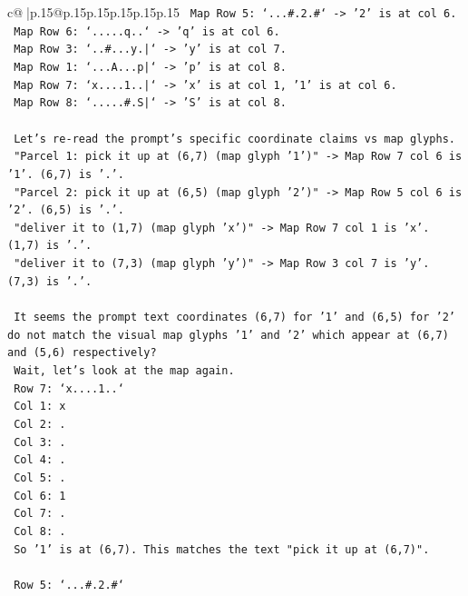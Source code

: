 \documentclass{article}
\begin{document}
{\begin{supertabular}{c@{$\;$}|p{.15\linewidth}@{}p{.15\linewidth}p{.15\linewidth}p{.15\linewidth}p{.15\linewidth}p{.15\linewidth}}
{{{\texttt{       Map Row 5: `...\#.2.\#` {-}> '2' is at col 6.} \\
\texttt{       Map Row 6: `.....q..` {-}> 'q' is at col 6.} \\
\texttt{       Map Row 3: `..\#...y.|` {-}> 'y' is at col 7.} \\
\texttt{       Map Row 1: `...A...p|` {-}> 'p' is at col 8.} \\
\texttt{       Map Row 7: `x....1..|` {-}> 'x' is at col 1, '1' is at col 6.} \\
\texttt{       Map Row 8: `.....\#.S|` {-}> 'S' is at col 8.} \\
\\ 
\texttt{       Let's re{-}read the prompt's specific coordinate claims vs map glyphs.} \\
\texttt{       "Parcel 1: pick it up at (6,7) (map glyph '1')" {-}> Map Row 7 col 6 is '1'. (6,7) is '.'.} \\
\texttt{       "Parcel 2: pick it up at (6,5) (map glyph '2')" {-}> Map Row 5 col 6 is '2'. (6,5) is '.'.} \\
\texttt{       "deliver it to (1,7) (map glyph 'x')" {-}> Map Row 7 col 1 is 'x'. (1,7) is '.'.} \\
\texttt{       "deliver it to (7,3) (map glyph 'y')" {-}> Map Row 3 col 7 is 'y'. (7,3) is '.'.} \\
\\ 
\texttt{       It seems the prompt text coordinates (6,7) for '1' and (6,5) for '2' do not match the visual map glyphs '1' and '2' which appear at (6,7) and (5,6) respectively?} \\
\texttt{       Wait, let's look at the map again.} \\
\texttt{       Row 7: `x....1..`} \\
\texttt{       Col 1: x} \\
\texttt{       Col 2: .} \\
\texttt{       Col 3: .} \\
\texttt{       Col 4: .} \\
\texttt{       Col 5: .} \\
\texttt{       Col 6: 1} \\
\texttt{       Col 7: .} \\
\texttt{       Col 8: .} \\
\texttt{       So '1' is at (6,7). This matches the text "pick it up at (6,7)".} \\
\\ 
\texttt{       Row 5: `...\#.2.\#`} \\
}}}
\end{supertabular}}
\end{document}
